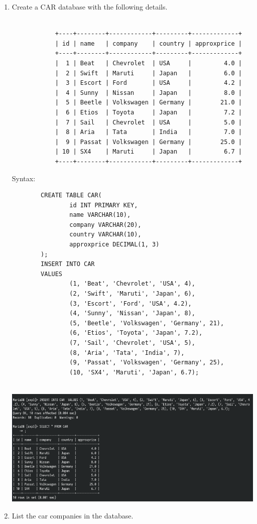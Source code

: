 \documentclass[13pt,oneside]{book}
\begin{document}
			\begin{enumerate}
		\item
		Create a CAR database with the following details.
		\begin{verbatim}
		
			+----+--------+------------+---------+-------------+
			| id | name   | company    | country | approxprice |
			+----+--------+------------+---------+-------------+
			|  1 | Beat   | Chevrolet  | USA     |         4.0 |
			|  2 | Swift  | Maruti     | Japan   |         6.0 |
			|  3 | Escort | Ford       | USA     |         4.2 |
			|  4 | Sunny  | Nissan     | Japan   |         8.0 |
			|  5 | Beetle | Volkswagen | Germany |        21.0 |
			|  6 | Etios  | Toyota     | Japan   |         7.2 |
			|  7 | Sail   | Chevrolet  | USA     |         5.0 |
			|  8 | Aria   | Tata       | India   |         7.0 |
			|  9 | Passat | Volkswagen | Germany |        25.0 |
			| 10 | SX4    | Maruti     | Japan   |         6.7 |
			+----+--------+------------+---------+-------------+
		\end{verbatim}
		 
		Syntax:
		\begin{verbatim}
		CREATE TABLE CAR(
				id INT PRIMARY KEY,
				name VARCHAR(10),
				company VARCHAR(20),
				country VARCHAR(10),
				approxprice DECIMAL(1, 3)
		);
		INSERT INTO CAR 
		VALUES
				(1, 'Beat', 'Chevrolet', 'USA', 4),
				(2, 'Swift', 'Maruti', 'Japan', 6),
				(3, 'Escort', 'Ford', 'USA', 4.2),
				(4, 'Sunny', 'Nissan', 'Japan', 8),
				(5, 'Beetle', 'Volkswagen', 'Germany', 21),
				(6, 'Etios', 'Toyota', 'Japan', 7.2),
				(7, 'Sail', 'Chevrolet', 'USA', 5),
				(8, 'Aria', 'Tata', 'India', 7),
				(9, 'Passat', 'Volkswagen', 'Germany', 25),
				(10, 'SX4', 'Maruti', 'Japan', 6.7);
		
		\end{verbatim}
		\includegraphics[width=\textwidth]{img/p3/ss1.png}
		
		
		\item
		List the car companies in the database.
		 

\end{enumerate}
\end{document}
